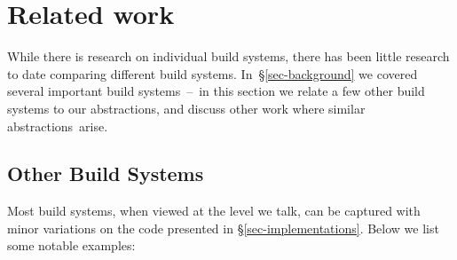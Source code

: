 \section{Related work}\label{sec-related}

While there is research on individual build systems, there has been little
research to date comparing different build systems. In~\S\ref{sec-background} we
covered several important build systems~--~in this section we relate a few
other build systems to our abstractions, and discuss other work where similar
abstractions~arise.

\subsection{Other Build Systems}\label{sec-related-build}

Most build systems, when viewed at the level we talk, can be captured with minor
variations on the code presented in \S\ref{sec-implementations}. Below we list
some notable examples:

